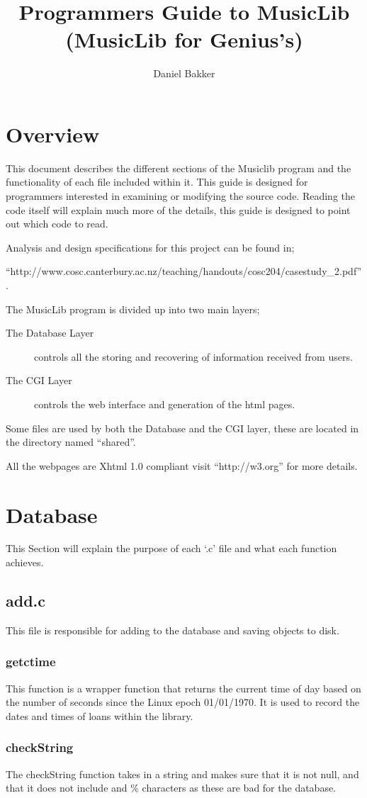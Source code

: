 \documentclass{article}
\title{Programmers Guide to MusicLib (MusicLib for Genius's)}
\author{Daniel Bakker}
\begin{document}
\tableofcontents
\newpage
\section{Overview}
This document describes the different sections of the Musiclib program and the functionality of each file included within it. This guide is designed for programmers interested in examining or modifying the source code. Reading the code itself will explain much more of the details, this guide is designed to point out which code to read.

Analysis and design specifications for this project can be found in;

 ``http://www.cosc.canterbury.ac.nz/teaching/handouts/cosc204/casestudy\_2.pdf''.

The MusicLib program is divided up into two main layers;
\begin{description} 
\item[The Database Layer] controls all the storing and recovering of information received from users.
\item[The CGI Layer] controls the web interface and generation of the html pages.
\end{description}

Some files are used by both the Database and the CGI layer, these are located in the directory named ``shared''.

All the webpages are Xhtml 1.0 compliant visit ``http://w3.org'' for more details.

\section{Database}
This Section will explain the purpose of each `.c' file and what each function achieves.
\subsection{add.c}
This file is responsible for adding to the database and saving objects to disk.

\subsubsection*{getctime}
 This function is a wrapper function that returns the current time of day based on the number of seconds since the Linux epoch 01/01/1970. It is used to record the dates and times of loans within the library.

\subsubsection*{checkString}
 The checkString function takes in a string and makes sure that it is not null, and that it does not include and \% characters as these are bad for the database.
\end{document}
